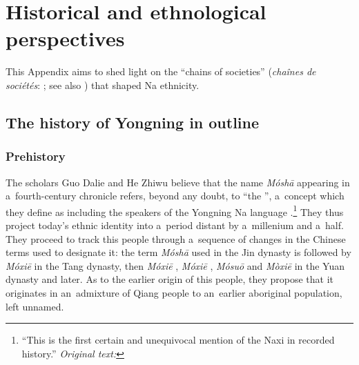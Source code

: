 \chapter{Historical and ethnological perspectives} 
\label{chap:appendixb}
\label{chap:historyanthropologysociology}

This Appendix aims to shed light on the “chains of societies” (\textit{chaînes de sociétés}: \citealt{amselle1990}; see also \citealt[329--331]{tryon1998}) that shaped Na ethnicity.




\section{The history of Yongning in outline}
\label{sec:historicaloutline}

\subsection{Prehistory}
\label{sec:prehistory}

The  scholars Guo
Dalie  and 
He Zhiwu  believe that the name 
\textit{Móshā}  appearing in a~fourth-century chronicle refers, beyond any doubt, to “the ”, a~concept which they define as including the speakers of the Yongning Na language \citep[102-103]{guoetal1994}.\footnote{“This is the first certain and unequivocal mention of the {Naxi} in recorded history.” \textit{Original text:} } They thus project today's ethnic identity into a~period distant by a~millenium and a~half. They proceed to track this people through a~sequence of changes in the {Chinese} terms used to designate it: the term \textit{Móshā}  used in the Jin dynasty is followed by \textit{Móxiē}  in the Tang dynasty, then \textit{Móxiē} , \textit{Móxiē} , \textit{Mósuō}  and \textit{Mòxiē}  in the Yuan dynasty and later. As to the earlier origin of this people, they propose that it originates in an~admixture of Qiang  people to an~earlier aboriginal population, left unnamed.


